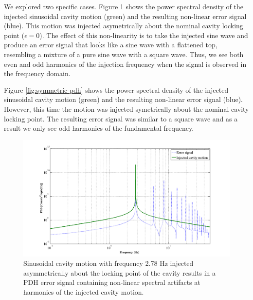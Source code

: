 We explored two specific cases. Figure \ref{fig:asymmetric-pdh} shows the 
power spectral density of the injected sinusoidal 
cavity motion (green) and the resulting non-linear error signal (blue). 
This motion was injected asymetrically about the nominal cavity locking point 
($\epsilon = 0$). The effect of this non-linearity is to take the injected 
sine wave and produce an error signal that looks like a sine wave with a 
flattened top, resembling a mixture of a pure sine wave with a square wave. 
Thus, we see both even and odd harmonics of the injection frequency when the 
signal is observed in the frequency domain.

Figure \ref{fig:symmetric-pdh} shows the power spectral density of the injected 
sinusoidal cavity motion (green) and the 
resulting non-linear error signal (blue). However, this time the motion was 
injected symetrically about the nominal cavity locking point. The resulting 
error signal was similar to a square wave and as a result 
we only see odd harmonics of the fundamental frequency.

\begin{figure}[h!]
\includegraphics[height=0.6\textwidth]{figures/IMCUpconversion/PDH_error_signal_harmonics.png}
\caption[PDH response to asymmetric cavity motion]{Sinusoidal cavity motion with frequency 2.78 Hz injected asymmetrically about the locking point of the cavity results in a PDH error signal containing non-linear spectral artifacts at harmonics of the injected cavity motion.}
\label{fig:asymmetric-pdh}
\end{figure}

